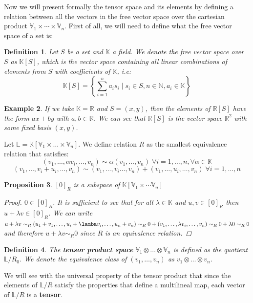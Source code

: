 \documentclass[11pt,a4paper,openright,oneside]{book}
\numberwithin{equation}{section}
\newtheorem{defn0}{Definition}[chapter]
\newtheorem{prop0}[defn0]{Proposition}
\newtheorem{example0}[defn0]{Example}
\newenvironment{definition}{ \begin{defn0}}{\end{defn0}}
\newenvironment{proposition}{\bigskip \begin{prop0}}{\end{prop0}}
\newenvironment{example}{ \begin{example0}\rm}{\end{example0}}
\begin{document}
Now we will present formally the tensor space and its elements by defining a relation between all the vectors in the free vector space over the cartesian product
$\mathbb{V}_1 \times \cdots \times \mathbb{V}_n$. First of all, we will need to define what the free vector space of a set is:

\begin{definition} Let $S$ be a set and $\mathbb{K}$ a field. We denote the free vector space over $S$ as $\mathbb{K}[S]$, which
    is the vector space containing all linear combinations of elements from $S$ with coefficients of $\mathbb{K}$, i.e:
    $$\mathbb{K}[S] = \left\{ \sum_{i=1}^n a_i s_i \mid s_i \in S, n \in \mathbb{N}, a_i \in \mathbb{K}  \right\}$$
\end{definition}

\begin{example} If we take $\mathbb{K} = \mathbb{R}$ and $S = (x,y)$, then the elements of $\mathbb{R}[S]$ have the form $ax + by$ with $a, b \in \mathbb{R}$.
We can see that $\mathbb{R}[S]$ is the vector space $\mathbb{R}^2$ with some fixed basis $(x, y)$.
\end{example}

Let $\mathbb{L} = \mathbb{K}[\mathbb{V}_1 \times \dots \times \mathbb{V}_n]$.
    We define relation $R$ as the smallest equivalence relation that satisfies: 
    $$(v_1, \dots, \alpha v_i, \dots, v_n) \sim \alpha(v_1, \dots, v_n) \; \forall i = 1, \dots, n, \forall \alpha \in \mathbb{K}$$
    $$(v_1, \dots, v_i + u_i, \dots, v_n) \sim (v_1, \dots, v_i \dots, v_n) + (v_1, \dots, u_i, \dots, v_n) \; \forall i = 1, \dots, n$$

\begin{proposition}
    $[0]_R$ is a subspace of $\mathbb{K} \left[ \mathbb{V}_1 \times \cdots \mathbb{V}_n \right]$

    \begin{proof}
        $0 \in [0]_R$. It is sufficient to see that for all $\lambda \in \mathbb{K}$ and $u, v \in [0]_R$ then $u + \lambda v \in [0]_R$.
        We can write $u + \lambda v \sim_R (u_1 + v_1, \dots, u_i + \lamba v_i, \dots, u_n + v_n) \sim_R 0 + (v_1, \dots, \lambda v_i, \dots, v_n) \sim_R 0 + \lambda 0 \sim_R 0$ and therefore
        $u + \lambda v \sim_R 0$ since $R$ is an equivalence relation.
    \end{proof}
\end{proposition}

\begin{definition} 
    The \textbf{tensor product space} $\mathbb{V}_1 \otimes \dots \otimes \mathbb{V}_n$ is defined as the quotient $\mathbb{L} / R_0$. 
    We denote the equivalence class of $(v_1, \dots, v_n)$ as $v_1 \otimes \dots \otimes v_n$. 
\end{definition}
    We will see with the universal property of the tensor product that since the 
    elements of $\mathbb{L}/R$ satisfy the properties that define a multilineal map, each vector of $\mathbb{L} / R$ is a \textbf{tensor}.
\end{document}
